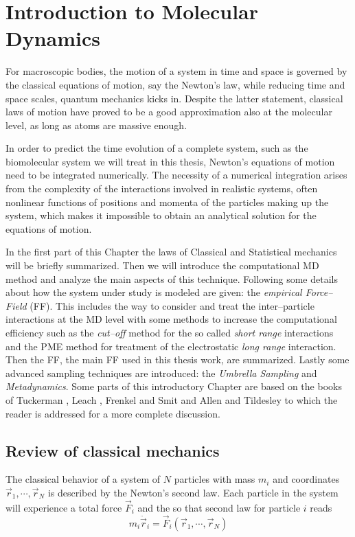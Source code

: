 \chapter{Introduction to Molecular Dynamics}
For macroscopic bodies, the motion of a system in time and space is governed by the classical equations of motion, say the Newton’s law, while reducing time and space scales, quantum mechanics kicks in. Despite the latter statement, classical laws of motion have proved to be a good approximation also at the molecular level, as long as atoms are massive enough.

In order to predict the time evolution of a complete system, such as the biomolecular system we will treat in this thesis, Newton’s equations of motion need to be integrated numerically. The necessity of a numerical integration arises from the complexity of the interactions involved in realistic systems, often nonlinear functions of positions and momenta of the particles making up the system, which makes it impossible to obtain an analytical solution for the equations of motion.

In the first part of this Chapter the laws of Classical and Statistical mechanics will be briefly summarized.
Then we will introduce the computational \acf{MD} method and analyze the main aspects of this technique.
Following some details about how the system under study is modeled are given: the \textit{empirical Force--Field} (\acs{FF}). This includes the way to consider and treat the inter--particle interactions at the \ac{MD} level with some methods to increase the computational efficiency such as the \textit{cut--off} method for the so called \textit{short range} interactions and the \ac{PME} method for treatment of the electrostatic \textit{long range} interaction.
Then the \martini \ac{FF}, the main \ac{FF} used in this thesis work, are summarized. Lastly some advanced sampling techniques are introduced: the \textit{Umbrella Sampling} and \textit{Metadynamics}. Some parts of this introductory Chapter are based on the books of Tuckerman \cite{Tuckerman}, Leach \cite{Leach}, Frenkel and Smit \cite{Frenkel} and Allen and Tildesley \cite{Allen} to which the reader is addressed for a more complete discussion.

\section{Review of classical mechanics}
The classical behavior of a system of $N$ particles with mass $m_i$ and coordinates $\vec r_1,\cdots,\vec r_N$ is described by the Newton's second law. Each particle in the system will experience a total force $\vec F_i$ and the so that second law for particle $i$ reads
\begin{equation}
	m_i \ddot{\vec{r}}_i = \vec F_i(\vec r_1,\cdots,\vec r_N)
	\label{eq:newtonLaw}
\end{equation}

